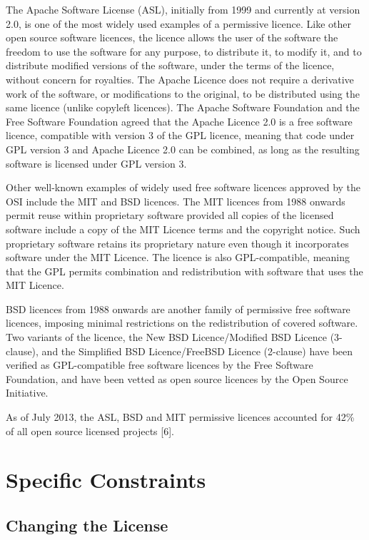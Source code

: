 \documentclass[12pt,a4paper]{article}
\begin{document}
The Apache Software License (ASL), initially from 1999 and currently at version 2.0, is one of the most widely used examples of a permissive licence. Like other open source software licences, the licence allows the user of the software the freedom to use the software for any purpose, to distribute it, to modify it, and to distribute modified versions of the software, under the terms of the licence, without concern for royalties.  The Apache Licence does not require a derivative work of the software, or modifications to the original, to be distributed using the same licence (unlike copyleft licences). The Apache Software Foundation and the Free Software Foundation agreed that the Apache Licence 2.0 is a free software licence, compatible with version 3 of the GPL licence, meaning that code under GPL version 3 and Apache Licence 2.0 can be combined, as long as the resulting software is licensed under GPL version 3. 

Other well-known examples of widely used free software licences approved by the OSI include the MIT and BSD licences. The MIT licences from 1988 onwards permit reuse within proprietary software provided all copies of the licensed software include a copy of the MIT Licence terms and the copyright notice. Such proprietary software retains its proprietary nature even though it incorporates software under the MIT Licence. The licence is also GPL-compatible, meaning that the GPL permits combination and redistribution with software that uses the MIT Licence. 

BSD licences from 1988 onwards are another family of permissive free software licences, imposing minimal restrictions on the redistribution of covered software. Two variants of the licence, the New BSD Licence/Modified BSD Licence (3-clause), and the Simplified BSD Licence/FreeBSD Licence (2-clause) have been verified as GPL-compatible free software licences by the Free Software Foundation, and have been vetted as open source licences by the Open Source Initiative.

As of July 2013, the ASL, BSD and MIT permissive licences accounted for 42\% of all open source licensed projects [6].

\section{Specific Constraints}
\label{sec:SpecificConstraints}

\subsection{Changing the License}
\label{sec:LicenseChange}
\end{document}
